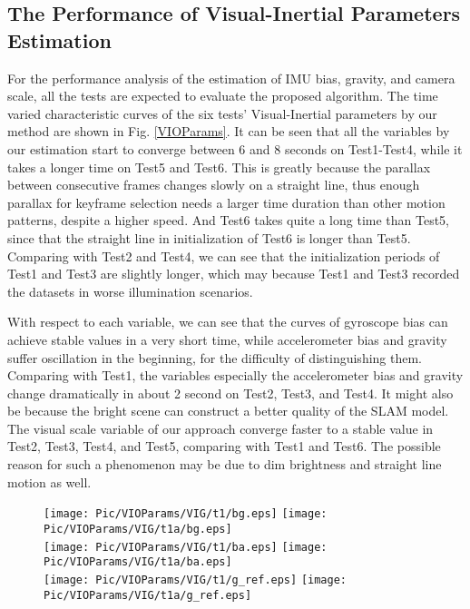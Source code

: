 \documentclass[journal,article,submit,moreauthors,pdftex]{Definitions/mdpi}
\begin{document}
\subsection{The Performance of Visual-Inertial Parameters Estimation}

For the performance analysis of the estimation of  IMU bias, gravity, and 
camera scale, all the tests are expected to evaluate the proposed 
algorithm.
The time varied characteristic curves of the six tests' Visual-Inertial 
parameters by our method are shown in Fig. \ref{VIOParams}.
It can be seen that all the variables by our estimation start to 
converge between 6 and 8 seconds on Test1-Test4, while it 
takes a longer time on Test5 and Test6. 
This is greatly because the parallax between consecutive frames 
changes slowly on a straight line, thus enough parallax for 
keyframe selection needs a larger time duration than other motion 
patterns, despite a higher speed.
And Test6 takes quite a long time than Test5, since that the straight 
line in initialization of Test6 is longer than Test5.
Comparing with Test2 and Test4, we can see that the initialization periods 
of Test1 and Test3 are slightly longer, which may because Test1 and Test3 
recorded the datasets in worse illumination scenarios.

With respect to each variable, we can see that the curves of 
gyroscope bias can achieve stable values in a very short time, 
while accelerometer bias and gravity suffer oscillation in the 
beginning, for the difficulty of distinguishing them.
Comparing with Test1, the variables especially the accelerometer 
bias and gravity change dramatically in about 2 second on Test2, Test3, 
and Test4.
It might also be because the bright scene can construct a better 
quality of the SLAM model.
The visual scale variable of our approach converge faster to a stable 
value in Test2, Test3, Test4, and Test5, comparing with Test1 and Test6.
The possible reason for such a phenomenon may be due to dim brightness 
and straight line motion as well.

\begin{figure}[H]
	\centering
	\texttt{[image: Pic/VIOParams/VIG/t1/bg.eps]}
	\texttt{[image: Pic/VIOParams/VIG/t1a/bg.eps]} \\
	\texttt{[image: Pic/VIOParams/VIG/t1/ba.eps]}
	\texttt{[image: Pic/VIOParams/VIG/t1a/ba.eps]} \\
	\texttt{[image: Pic/VIOParams/VIG/t1/g\_ref.eps]}
	\texttt{[image: Pic/VIOParams/VIG/t1a/g\_ref.eps]} \\
	 \\
\end{figure}
\end{document}
